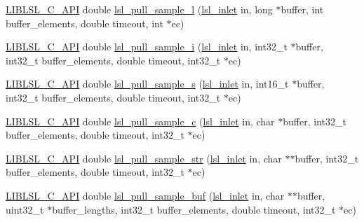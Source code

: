 \begin{DoxyCompactItemize}
\item 
\hyperlink{lsl__cpp_8h_aafd0ef1813e8be84a1420c4f1df64615}{L\+I\+B\+L\+S\+L\+\_\+\+C\+\_\+\+A\+PI} double \hyperlink{namespacelsl_a7572c63f7c2569ddffb3ac2d8c16bd1e}{lsl\+\_\+pull\+\_\+sample\+\_\+l} (\hyperlink{namespacelsl_a884a3363cfcba75d7ce8f00c1c4c54f1}{lsl\+\_\+inlet} in, long $\ast$buffer, int buffer\+\_\+elements, double timeout, int $\ast$ec)
\item 
\hyperlink{lsl__cpp_8h_aafd0ef1813e8be84a1420c4f1df64615}{L\+I\+B\+L\+S\+L\+\_\+\+C\+\_\+\+A\+PI} double \hyperlink{namespacelsl_a201e5c7d48e0b815c30bb155f116eb42}{lsl\+\_\+pull\+\_\+sample\+\_\+i} (\hyperlink{namespacelsl_a884a3363cfcba75d7ce8f00c1c4c54f1}{lsl\+\_\+inlet} in, int32\+\_\+t $\ast$buffer, int32\+\_\+t buffer\+\_\+elements, double timeout, int32\+\_\+t $\ast$ec)
\item 
\hyperlink{lsl__cpp_8h_aafd0ef1813e8be84a1420c4f1df64615}{L\+I\+B\+L\+S\+L\+\_\+\+C\+\_\+\+A\+PI} double \hyperlink{namespacelsl_a9c1676b5e509980eeb5065a2c84144c4}{lsl\+\_\+pull\+\_\+sample\+\_\+s} (\hyperlink{namespacelsl_a884a3363cfcba75d7ce8f00c1c4c54f1}{lsl\+\_\+inlet} in, int16\+\_\+t $\ast$buffer, int32\+\_\+t buffer\+\_\+elements, double timeout, int32\+\_\+t $\ast$ec)
\item 
\hyperlink{lsl__cpp_8h_aafd0ef1813e8be84a1420c4f1df64615}{L\+I\+B\+L\+S\+L\+\_\+\+C\+\_\+\+A\+PI} double \hyperlink{namespacelsl_aaa7da3f1fd36b31afafbfaf5eac09fbb}{lsl\+\_\+pull\+\_\+sample\+\_\+c} (\hyperlink{namespacelsl_a884a3363cfcba75d7ce8f00c1c4c54f1}{lsl\+\_\+inlet} in, char $\ast$buffer, int32\+\_\+t buffer\+\_\+elements, double timeout, int32\+\_\+t $\ast$ec)
\item 
\hyperlink{lsl__cpp_8h_aafd0ef1813e8be84a1420c4f1df64615}{L\+I\+B\+L\+S\+L\+\_\+\+C\+\_\+\+A\+PI} double \hyperlink{namespacelsl_a3fd4085148eab55ea6a918dc151869a3}{lsl\+\_\+pull\+\_\+sample\+\_\+str} (\hyperlink{namespacelsl_a884a3363cfcba75d7ce8f00c1c4c54f1}{lsl\+\_\+inlet} in, char $\ast$$\ast$buffer, int32\+\_\+t buffer\+\_\+elements, double timeout, int32\+\_\+t $\ast$ec)
\item 
\hyperlink{lsl__cpp_8h_aafd0ef1813e8be84a1420c4f1df64615}{L\+I\+B\+L\+S\+L\+\_\+\+C\+\_\+\+A\+PI} double \hyperlink{namespacelsl_aeb6a1e871e465e4859292bc46a2e5bbd}{lsl\+\_\+pull\+\_\+sample\+\_\+buf} (\hyperlink{namespacelsl_a884a3363cfcba75d7ce8f00c1c4c54f1}{lsl\+\_\+inlet} in, char $\ast$$\ast$buffer, uint32\+\_\+t $\ast$buffer\+\_\+lengths, int32\+\_\+t buffer\+\_\+elements, double timeout, int32\+\_\+t $\ast$ec)
\item 

\end{DoxyCompactItemize}
